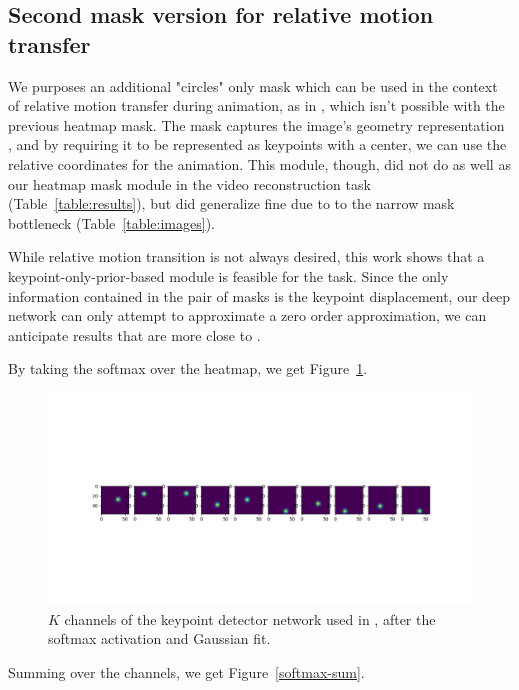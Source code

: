 \documentclass{article}
\begin{document}
\subsection{Second mask version for relative motion transfer}
\label{circles-mask}
We purposes an additional "circles" only mask
which can be used in the context
of relative motion transfer during animation, as in
\cite{siarohin2020order}, which isn't possible with the previous heatmap mask.
The mask captures the image's geometry representation \cite{wu2019transgaga},
and by requiring it to be represented as keypoints with a center, we can use
the relative coordinates for the animation. This module, though, did not do
as well as our heatmap mask module in the video reconstruction task
(Table~\ref{table:results}), but did generalize fine due to to the narrow
mask bottleneck (Table~\ref{table:images}).

While relative motion transition is not always desired, this work shows that
a keypoint-only-prior-based module is feasible for the task.
Since the only information contained in the pair of masks is the keypoint
displacement, our deep network can only attempt to approximate a zero order
approximation, we can anticipate results that are more close to
\cite{siarohin2019animating}.

By taking the softmax over the heatmap, we get Figure~\ref{softmax-10kp}.
\begin{figure}[ht]
\vskip 0.2in
\begin{center}
\centerline{\includegraphics[width=\columnwidth]{visualizations/softmax_10kp}}
\caption{
$K$ channels of the keypoint detector network used in
\cite{siarohin2020order}, after the softmax activation and Gaussian fit.
}
\label{softmax-10kp}
\end{center}
\vskip -0.2in
\end{figure}

Summing over the channels, we get Figure~\ref{softmax-sum}.
\end{document}
